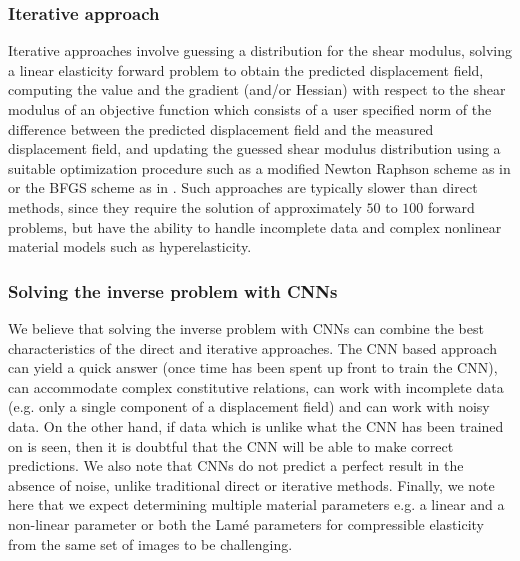 \documentclass[12pt]{article}
\begin{document}
\subsubsection{Iterative approach} Iterative approaches \cite{paper:oberai2003,paper:gokhale2008,paper:kalle1996,paper:doyley,paper:goenezen2011} involve guessing a distribution for the shear modulus, solving a linear elasticity forward problem to obtain the predicted displacement field, computing the value and the gradient (and/or Hessian) with respect to the shear modulus of an objective function which consists of a user specified norm of the difference between the predicted displacement field and the measured displacement field, and updating the guessed shear modulus distribution using a suitable optimization procedure such as a modified Newton Raphson scheme as in \cite{paper:doyley} or the BFGS scheme as in \cite{paper:gokhale2008,paper:goenezen2011}. Such approaches are typically slower than direct methods, since they require the solution of approximately $50$ to $100$ forward problems, but have the ability to handle incomplete data and complex nonlinear material models such as hyperelasticity.
\subsubsection{Solving the inverse problem with CNNs}
We believe that solving the inverse problem with CNNs can combine the best characteristics of the direct and iterative approaches. The CNN based approach can yield a quick answer (once time has been spent up front to train the CNN), can accommodate complex constitutive relations, can work with incomplete data (e.g. only a single component of a displacement field) and can work with noisy data. On the other hand, if data which is unlike what the CNN has been trained on is seen, then it is doubtful that the CNN will be able to make correct predictions. We also note that CNNs do not predict a perfect result in the absence of noise, unlike traditional direct or iterative methods. Finally, we note here that we expect determining multiple material parameters e.g. a linear and a non-linear parameter or both the Lam\'e parameters for compressible elasticity from the same set of images to be challenging.
\end{document}
